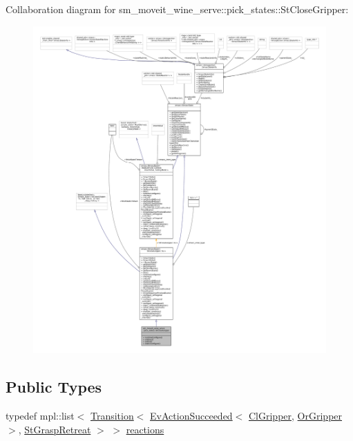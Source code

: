 Collaboration diagram for sm\+\_\+moveit\+\_\+wine\+\_\+serve\+:\+:pick\+\_\+states\+:\+:St\+Close\+Gripper\+:
\nopagebreak
\begin{figure}[H]
\begin{center}
\leavevmode
\includegraphics[width=350pt]{structsm__moveit__wine__serve_1_1pick__states_1_1StCloseGripper__coll__graph}
\end{center}
\end{figure}
\subsection*{Public Types}
\begin{DoxyCompactItemize}
\item 
typedef mpl\+::list$<$ \hyperlink{classsmacc_1_1Transition}{Transition}$<$ \hyperlink{structsmacc_1_1default__events_1_1EvActionSucceeded}{Ev\+Action\+Succeeded}$<$ \hyperlink{classsm__moveit__wine__serve_1_1cl__gripper_1_1ClGripper}{Cl\+Gripper}, \hyperlink{classsm__moveit__wine__serve_1_1OrGripper}{Or\+Gripper} $>$, \hyperlink{structsm__moveit__wine__serve_1_1pick__states_1_1StGraspRetreat}{St\+Grasp\+Retreat} $>$ $>$ \hyperlink{structsm__moveit__wine__serve_1_1pick__states_1_1StCloseGripper_a725db6c10ec5d4985bfa56cdc0040bb3}{reactions}
\end{DoxyCompactItemize}
